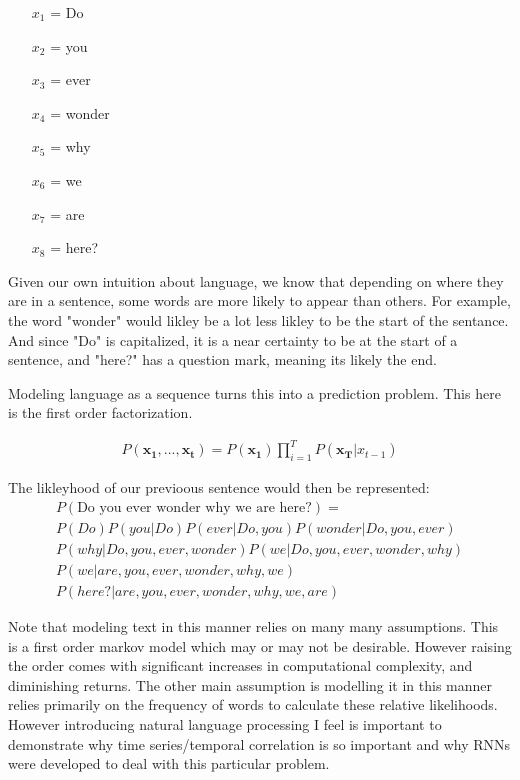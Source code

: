 \documentclass{article}
\begin{document}
\begin{enumerate}
\item[$x_1$] = Do
\item[$x_2$] = you
\item[$x_3$] = ever
\item[$x_4$] = wonder
\item[$x_5$] = why
\item[$x_6$] = we
\item[$x_7$] = are
\item[$x_8$] = here?
\end{enumerate}

Given our own intuition about language, we know that depending on where they are in a sentence, some words are more likely to appear than others. For example, the word "wonder" would likley be a lot less likley to be the start of the sentance. And since "Do" is capitalized, it is a near certainty to be at the start of a sentence, and "here?" has a question mark, meaning its likely the end.

Modeling language as a sequence turns this into a prediction problem. This here is the first order factorization.

\begin{align*}
P(\mathbf{x_1},...,\mathbf{x_t}) = P(\mathbf{x_1}) \prod_{i=1}^{T} P(\mathbf{x_T}|x_{t-1})
\end{align*}

The likleyhood of our previoous sentence would then be represented:
\begin{align*}
P(\text{Do you ever wonder why we are here?}) = \\ P(Do) P(you|Do) P(ever|Do,you) P(wonder|Do,you,ever) \\ P(why|Do,you,ever,wonder) P(we|Do,you,ever,wonder,why) \\ P(we|are,you,ever,wonder,why,we) \\ P(here?|are,you,ever,wonder,why,we,are)
\end{align*}

Note that modeling text in this manner relies on many many assumptions. This is a first order markov model which may or may not be desirable. However raising the order comes with significant increases in computational complexity, and diminishing returns. The other main assumption is modelling it in this manner relies primarily on the frequency of words to calculate these relative likelihoods. However introducing natural language processing I feel is important to demonstrate why time series/temporal correlation is so important and why RNNs were developed to deal with this particular problem.
\end{document}
